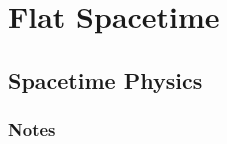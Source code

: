 \documentclass[12pt]{report}
\begin{document}
\onehalfspacing

\pagestyle{fancy}
\cfoot{\thepage/\pageref{LastPage}}

\tableofcontents

\chapter{Flat Spacetime}

\section{Spacetime Physics}

\subsection{Notes}
\end{document}
